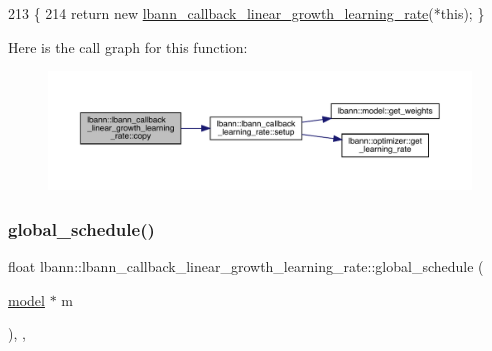 \begin{DoxyCode}
213                                                                     \{
214     \textcolor{keywordflow}{return} \textcolor{keyword}{new} \hyperlink{classlbann_1_1lbann__callback__linear__growth__learning__rate_a9eb24d8032af168a0eeec7e385909d55}{lbann\_callback\_linear\_growth\_learning\_rate}(*\textcolor{keyword}{this});
       \}
\end{DoxyCode}
Here is the call graph for this function\+:\nopagebreak
\begin{figure}[H]
\begin{center}
\leavevmode
\includegraphics[width=350pt]{classlbann_1_1lbann__callback__linear__growth__learning__rate_aadb1266a360c5442e094113b919f6c13_cgraph}
\end{center}
\end{figure}
\mbox{\label{classlbann_1_1lbann__callback__linear__growth__learning__rate_ad292e2e7f4078162ed93b6e05d94e0e4}} 
\subsubsection{\texorpdfstring{global\+\_\+schedule()}{global\_schedule()}}
{\footnotesize\ttfamily float lbann\+::lbann\+\_\+callback\+\_\+linear\+\_\+growth\+\_\+learning\+\_\+rate\+::global\+\_\+schedule (\begin{DoxyParamCaption}\item[{\hyperlink{classlbann_1_1model}{model} $\ast$}]{m }\end{DoxyParamCaption})\hspace{0.3cm}{\ttfamily [override]}, {\ttfamily [protected]}, {\ttfamily [virtual]}}

